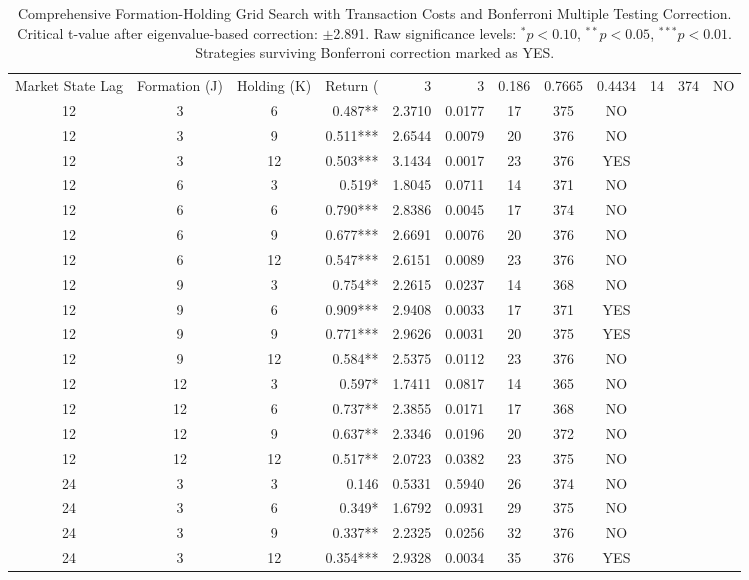 \begin{table}[htbp]
\caption{Comprehensive Formation-Holding Grid Search with Transaction Costs and Bonferroni Multiple Testing Correction. Critical t-value after eigenvalue-based correction: $\pm$2.891. Raw significance levels: $^{*}p<0.10$, $^{**}p<0.05$, $^{***}p<0.01$. Strategies surviving Bonferroni correction marked as YES.}
\label{tab:grid_costs_bonferroni_comprehensive}
\begin{tabular}{ccc|rrrcc|c}
\toprule
Market State Lag & Formation (J) & Holding (K) & Return (%
 & 3 & 3 & 0.186 & 0.7665 & 0.4434 & 14 & 374 & NO \\
12 & 3 & 6 & 0.487** & 2.3710 & 0.0177 & 17 & 375 & NO \\
12 & 3 & 9 & 0.511*** & 2.6544 & 0.0079 & 20 & 376 & NO \\
12 & 3 & 12 & 0.503*** & 3.1434 & 0.0017 & 23 & 376 & YES \\
12 & 6 & 3 & 0.519* & 1.8045 & 0.0711 & 14 & 371 & NO \\
12 & 6 & 6 & 0.790*** & 2.8386 & 0.0045 & 17 & 374 & NO \\
12 & 6 & 9 & 0.677*** & 2.6691 & 0.0076 & 20 & 376 & NO \\
12 & 6 & 12 & 0.547*** & 2.6151 & 0.0089 & 23 & 376 & NO \\
12 & 9 & 3 & 0.754** & 2.2615 & 0.0237 & 14 & 368 & NO \\
12 & 9 & 6 & 0.909*** & 2.9408 & 0.0033 & 17 & 371 & YES \\
12 & 9 & 9 & 0.771*** & 2.9626 & 0.0031 & 20 & 375 & YES \\
12 & 9 & 12 & 0.584** & 2.5375 & 0.0112 & 23 & 376 & NO \\
12 & 12 & 3 & 0.597* & 1.7411 & 0.0817 & 14 & 365 & NO \\
12 & 12 & 6 & 0.737** & 2.3855 & 0.0171 & 17 & 368 & NO \\
12 & 12 & 9 & 0.637** & 2.3346 & 0.0196 & 20 & 372 & NO \\
12 & 12 & 12 & 0.517** & 2.0723 & 0.0382 & 23 & 375 & NO \\
24 & 3 & 3 & 0.146 & 0.5331 & 0.5940 & 26 & 374 & NO \\
24 & 3 & 6 & 0.349* & 1.6792 & 0.0931 & 29 & 375 & NO \\
24 & 3 & 9 & 0.337** & 2.2325 & 0.0256 & 32 & 376 & NO \\
24 & 3 & 12 & 0.354*** & 2.9328 & 0.0034 & 35 & 376 & YES \\

\end{tabular}
\end{table}
